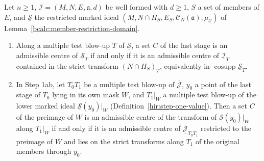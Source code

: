 \begin{lemma}
\label{bcalc:member-restrict-admissible}
\upstreamleanok
Let \(n\ge1\), \(\underline{\mathcal I}=(M,N,E,\mathfrak a,d)\) be well formed with \(d\ge1\), \(S\) a set of members of \(E\), and \(\underline{\mathcal S}\) the restricted marked ideal
\((M,N\cap H_S,E_S,\mathcal C_N(\mathfrak a),\mu_{\mathcal C})\) of Lemma~\ref{bcalc:member-restriction-domain}.
\begin{enumerate}
\item Along a multiple test blow-up \(T\) of \(\underline{\mathcal S}\), a set \(C\) of the last stage is an admissible centre of \(\underline{\mathcal S}_T\) if and only if it is an
admissible centre of \(\underline{\mathcal I}_T\) contained in the strict transform \((N\cap H_S)_T\), equivalently in \(\operatorname{cosupp}\underline{\mathcal S}_T\).
\item In Step 1ab, let \(T_0T_1\) be a multiple test blow-up of \(\overline{\underline{\mathcal J}}\), \(y_0\) a point of the last stage of \(T_0\) lying in its own mask \(W\), and
\(T_1|_W\) a multiple test blow-up of the lower marked ideal \(\underline{\mathcal S}(y_0)|_W\) (Definition~\ref{hir:step-one-value}). Then a set \(C\) of the preimage of \(W\) is an
admissible centre of the transform of \(\underline{\mathcal S}(y_0)|_W\) along \(T_1|_W\) if and only if it is an admissible centre of \(\overline{\underline{\mathcal J}}_{T_0T_1}\)
restricted to the preimage of \(W\) and lies on the strict transforms along \(T_1\) of the original members through \(y_0\).
\end{enumerate}
\end{lemma}
